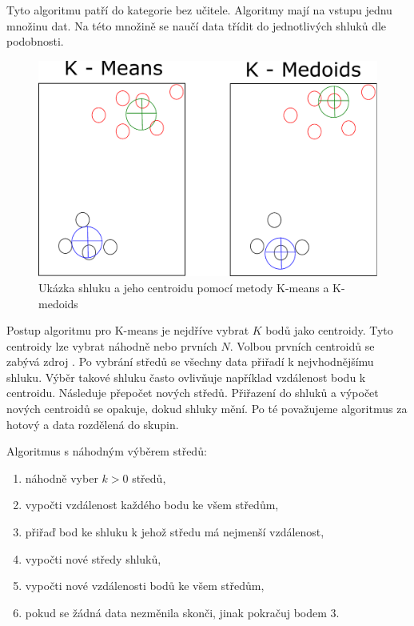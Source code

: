 \documentclass[thesis=M,czech]{FITthesis}[2012/10/20]
\newcommand{\tmpframe}[1]{\fbox{#1}}
\renewcommand{\tmpframe}[1]{#1}
\begin{document}
			Tyto algoritmu patří do kategorie bez učitele. Algoritmy mají na vstupu jednu množinu dat. Na této množině se naučí data třídit do jednotlivých shluků dle podobnosti.
			
			\begin{figure}[htb]\centering
				\tmpframe{\includegraphics[width=\textwidth]{./img/kmeansVSkmedoids}}		
				\caption{Ukázka shluku a jeho centroidu pomocí metody K-means a K-medoids}
				\label{fig:kMeansVSkMedoids}
			\end{figure}
		
			Postup algoritmu pro K-means je nejdříve vybrat $K$ bodů jako centroidy. Tyto centroidy lze vybrat náhodně nebo prvních $N$. Volbou prvních centroidů se zabývá zdroj \cite{kMeansInit}. Po vybrání středů se všechny data přiřadí k nejvhodnějšímu shluku. Výběr takové shluku často ovlivňuje například vzdálenost bodu k centroidu. Následuje přepočet nových středů. Přiřazení do shluků a výpočet nových centroidů se opakuje, dokud shluky mění. Po té považujeme algoritmus za hotový a data rozdělená do skupin.
			
			Algoritmus s náhodným výběrem středů:
			
			\begin{enumerate} 
				\item náhodně vyber $k > 0$ středů,
				\item vypočti vzdálenost každého bodu ke všem středům,
				\item přiřaď bod ke shluku k jehož středu má nejmenší vzdálenost,
				\item vypočti nové středy shluků,
				\item vypočti nové vzdálenosti bodů ke všem středům,
				\item pokud se žádná data nezměnila skonči, jinak pokračuj bodem 3.
			\end{enumerate}
			
\end{document}
